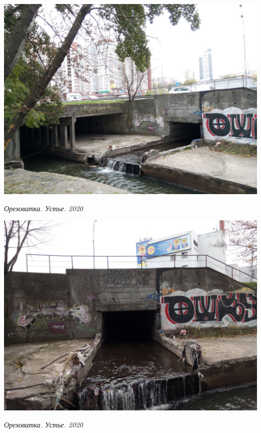 \begin{center}
\includegraphics[width=\linewidth]{rpix/IMG_20201109_125203.jpg}

\textit{Ореховатка. Устье. 2020}
\end{center}


\begin{center}
\includegraphics[width=\linewidth]{rpix/IMG_20201109_125811.jpg}

\textit{Ореховатка. Устье. 2020}
\end{center}




